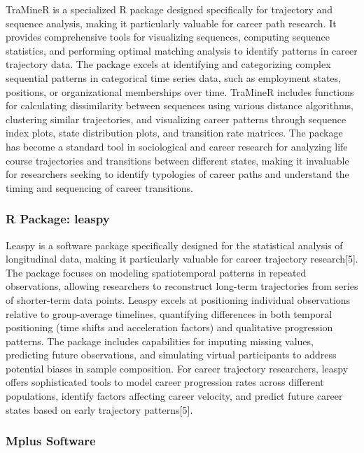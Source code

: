 \documentclass[
  letterpaper,
  DIV=11,
  numbers=noendperiod]{scrartcl}
\begin{document}
TraMineR is a specialized R package designed specifically for trajectory
and sequence analysis, making it particularly valuable for career path
research. It provides comprehensive tools for visualizing sequences,
computing sequence statistics, and performing optimal matching analysis
to identify patterns in career trajectory data. The package excels at
identifying and categorizing complex sequential patterns in categorical
time series data, such as employment states, positions, or
organizational memberships over time. TraMineR includes functions for
calculating dissimilarity between sequences using various distance
algorithms, clustering similar trajectories, and visualizing career
patterns through sequence index plots, state distribution plots, and
transition rate matrices. The package has become a standard tool in
sociological and career research for analyzing life course trajectories
and transitions between different states, making it invaluable for
researchers seeking to identify typologies of career paths and
understand the timing and sequencing of career transitions.

\subsubsection{R Package: leaspy}\label{r-package-leaspy}

Leaspy is a software package specifically designed for the statistical
analysis of longitudinal data, making it particularly valuable for
career trajectory research{[}5{]}. The package focuses on modeling
spatiotemporal patterns in repeated observations, allowing researchers
to reconstruct long-term trajectories from series of shorter-term data
points. Leaspy excels at positioning individual observations relative to
group-average timelines, quantifying differences in both temporal
positioning (time shifts and acceleration factors) and qualitative
progression patterns. The package includes capabilities for imputing
missing values, predicting future observations, and simulating virtual
participants to address potential biases in sample composition. For
career trajectory researchers, leaspy offers sophisticated tools to
model career progression rates across different populations, identify
factors affecting career velocity, and predict future career states
based on early trajectory patterns{[}5{]}.

\subsubsection{Mplus Software}\label{mplus-software}
\end{document}
